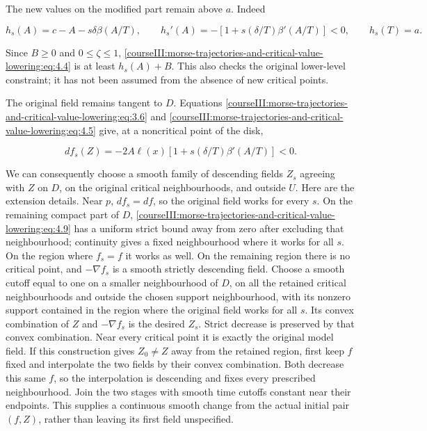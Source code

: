 The new values on the modified part remain above \(a\). Indeed

\begin{equation}
h_s(A)=c-A-s\delta\beta(A/T),\qquad
 h_s'(A)=-\left[1+s(\delta/T)\beta'(A/T)\right]<0,
 \qquad h_s(T)=a.
 \label{courseIII:morse-trajectories-and-critical-value-lowering:eq:4.8}
\end{equation}

Since \(B\geq0\) and \(0\leq\zeta\leq1\), \eqref{courseIII:morse-trajectories-and-critical-value-lowering:eq:4.4} is at least \(h_s(A)+B\). This also checks the original lower-level constraint; it has not been assumed from the absence of new critical points.

The original field remains tangent to \(D\). Equations \eqref{courseIII:morse-trajectories-and-critical-value-lowering:eq:3.6} and \eqref{courseIII:morse-trajectories-and-critical-value-lowering:eq:4.5} give, at a noncritical point of the disk,

\begin{equation}
df_s(Z)
 =
 -2A\ell(x)
 \left[1+s(\delta/T)\beta'(A/T)\right]<0.
 \label{courseIII:morse-trajectories-and-critical-value-lowering:eq:4.9}
\end{equation}

We can consequently choose a smooth family of descending fields \(Z_s\) agreeing with \(Z\) on \(D\), on the original critical neighbourhoods, and outside \(U\). Here are the extension details. Near \(p\), \(df_s=df\), so the original field works for every \(s\). On the remaining compact part of \(D\), \eqref{courseIII:morse-trajectories-and-critical-value-lowering:eq:4.9} has a uniform strict bound away from zero after excluding that neighbourhood; continuity gives a fixed neighbourhood where it works for all \(s\). On the region where \(f_s=f\) it works as well. On the remaining region there is no critical point, and \(-\nabla f_s\) is a smooth strictly descending field. Choose a smooth cutoff equal to one on a smaller neighbourhood of \(D\), on all the retained critical neighbourhoods and outside the chosen support neighbourhood, with its nonzero support contained in the region where the original field works for all \(s\). Its convex combination of \(Z\) and \(-\nabla f_s\) is the desired \(Z_s\). Strict decrease is preserved by that convex combination. Near every critical point it is exactly the original model field. If this construction gives \(Z_0\ne Z\) away from the retained region, first keep \(f\) fixed and interpolate the two fields by their convex combination. Both decrease this same \(f\), so the interpolation is descending and fixes every prescribed neighbourhood. Join the two stages with smooth time cutoffs constant near their endpoints. This supplies a continuous smooth change from the actual initial pair \((f,Z)\), rather than leaving its first field unspecified.

